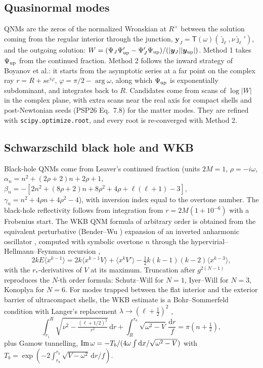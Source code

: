 \documentclass[11pt,a4paper]{article}
\numberwithin{equation}{section}
\newcommand{\dd}{\mathrm{d}}
\newcommand{\jh}{\hat\jmath_\ell}
\begin{document}
\subsection{Quasinormal modes}
QNMs are the zeros of the normalized Wronskian at $R^+$ between the solution coming from the regular interior
through the junction, $\bm y_J=\mathsf T(\omega)(\jh,\nu\jh')$, and the outgoing solution:
$W=(\Psi_J\Psi_{\rm up}'-\Psi_J'\Psi_{\rm up})/(|\bm y_J||\bm y_{\rm up}|)$. Method 1 takes $\Psi_{\rm up}$ from the
continued fraction. Method 2 follows the inward strategy of Boyanov et al.: it starts from the asymptotic series at a
far point on the complex ray $r=R+se^{i\varphi}$, $\varphi=\pi/2-\arg\omega$, along which $\Psi_{\rm up}$ is
exponentially subdominant, and integrates back to $R$. Candidates come from scans of $\log|W|$ in the complex plane,
with extra scans near the real axis for compact shells and post-Newtonian seeds (PSP26 Eq.~7.8) for the matter modes.
They are refined with \texttt{scipy.optimize.root}, and every root is re-converged with Method 2.

\subsection{Schwarzschild black hole and WKB}
Black-hole QNMs come from Leaver's continued fraction \cite{Leaver85} (units $2M=1$, $\rho=-i\omega$,
$\alpha_n=n^2+(2\rho+2)n+2\rho+1$, $\beta_n=-[2n^2+(8\rho+2)n+8\rho^2+4\rho+\ell(\ell+1)-3]$,
$\gamma_n=n^2+4\rho n+4\rho^2-4$), with inversion index equal to the overtone number. The black-hole reflectivity
follows from integration from $r=2M(1+10^{-6})$ with a Frobenius start. The WKB QNM formula of arbitrary order is
obtained from the equivalent perturbative (Bender--Wu \cite{BenderWu69}) expansion of an inverted anharmonic
oscillator \cite{Hatsuda20}, computed with symbolic overtone $n$ through the hypervirial--Hellmann--Feynman recursion
\cite{Killingbeck78,FernandezCastro87},
\begin{equation}
2kE\langle x^{k-1}\rangle=2k\langle x^{k-1}V\rangle+\langle x^kV'\rangle-\tfrac12k(k-1)(k-2)\langle x^{k-3}\rangle,
\end{equation}
with the $r_*$-derivatives of $V$ at its maximum. Truncation after $g^{2(N-1)}$ reproduces the $N$-th order formula:
Schutz--Will \cite{SW85} for $N=1$, Iyer--Will \cite{IW87,Iyer87} for $N=3$, Konoplya \cite{Konoplya03} for $N=6$.
For modes trapped between the flat interior and the exterior barrier of ultracompact shells, the WKB estimate is a
Bohr--Sommerfeld condition with Langer's replacement $\lambda\to(\ell+\frac12)^2$ \cite{Langer37},
\begin{equation}
\int_{r_1}^{R}\!\sqrt{\nu^2-\tfrac{(\ell+1/2)^2}{r^2}}\,\dd r+\int_R^{r_a}\!\sqrt{\omega^2-V}\,\frac{\dd r}{f}=\pi(n+\tfrac12),
\end{equation}
plus Gamow tunnelling,
${\rm Im}\,\omega=-T_b/(4\omega\int\dd x/\sqrt{\omega^2-V})$ with $T_b=\exp(-2\int_{r_a}^{r_b}\sqrt{V-\omega^2}\,\dd r/f)$.
\end{document}
